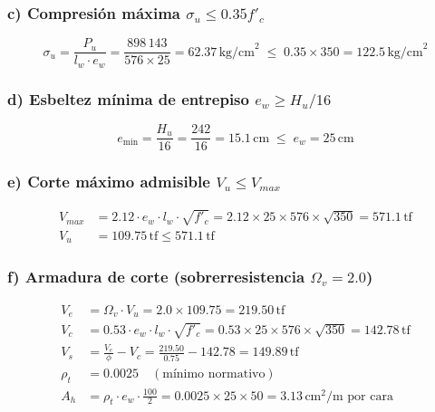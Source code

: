 \subsubsection*{c) Compresión máxima $\sigma_u \leq 0.35f'_c$}
\begin{equation*}
\sigma_u = \frac{P_u}{l_w\cdot e_w}
         = \frac{898\,143}{576\times25}
         = 62.37\,\text{kg/cm}^2
\;\leq\; 0.35\times350 = 122.5\,\text{kg/cm}^2
\end{equation*}

\subsubsection*{d) Esbeltez mínima de entrepiso $e_w \geq H_u/16$}
\begin{equation*}
e_{\min}=\frac{H_u}{16}=\frac{242}{16}=15.1\,\text{cm}
\;\leq\; e_w=25\,\text{cm}
\end{equation*}

\subsubsection*{e) Corte máximo admisible $V_u \leq V_{max}$}
\begin{align*}
V_{max} &= 2.12\cdot e_w\cdot l_w\cdot\sqrt{f'_c}
         = 2.12\times25\times576\times\sqrt{350} = 571.1\,\text{tf}\\
V_u     &= 109.75\,\text{tf} \leq 571.1\,\text{tf}
\end{align*}

\subsubsection*{f) Armadura de corte (sobrerresistencia $\Omega_v=2.0$)}
\begin{align*}
V_e   &= \Omega_v\cdot V_u = 2.0\times109.75=219.50\,\text{tf}\\
V_c   &= 0.53\cdot e_w\cdot l_w\cdot\sqrt{f'_c}
       = 0.53\times25\times576\times\sqrt{350}=142.78\,\text{tf}\\
V_s   &= \frac{V_e}{\phi}-V_c
       = \frac{219.50}{0.75}-142.78=149.89\,\text{tf}\\
\rho_t &= 0.0025\quad(\text{mínimo normativo})\\
A_h   &= \rho_t\cdot e_w\cdot\frac{100}{2}
       = 0.0025\times25\times50 = 3.13\,\text{cm}^2/\text{m por cara}
\end{align*}

